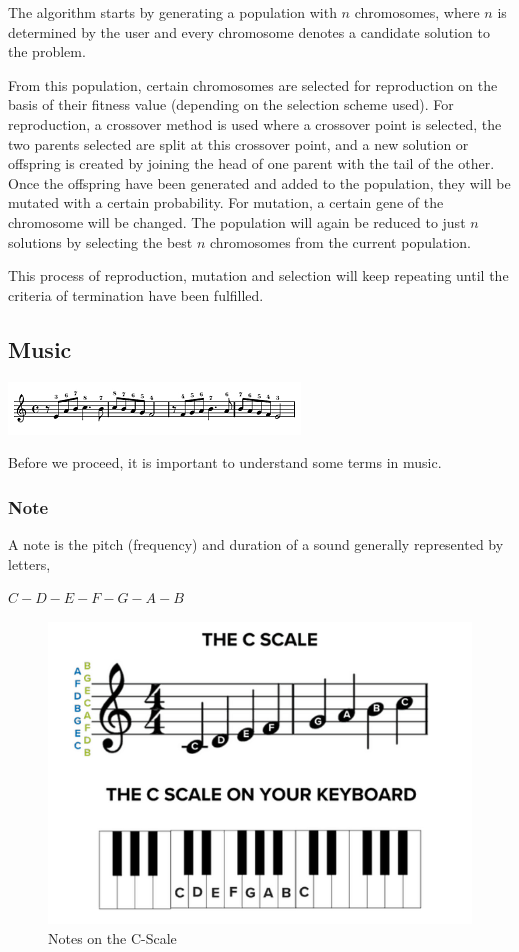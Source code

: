 \documentclass[conference]{IEEEtran}
\begin{document}
The algorithm starts by generating a population with $n$ chromosomes, where $n$ is determined by the user and every chromosome denotes a candidate solution to the problem.

From this population, certain chromosomes are selected for reproduction on the basis of their fitness value (depending on the selection scheme used). For reproduction, a crossover method is used where a crossover point is selected, the two parents selected are split at this crossover point, and a new solution or offspring is created by joining the head of one parent with the tail of the other. Once the offspring have been generated and added to the population, they will be mutated with a certain probability. For mutation, a certain gene of the chromosome will be changed. The population will again be reduced to just $n$ solutions by selecting the best $n$ chromosomes from the current population.

This process of reproduction, mutation and selection will keep repeating until the criteria of termination have been fulfilled.

\subsection{Music}
\includegraphics{music.png}

Before we proceed, it is important to understand some terms in music.

\subsubsection{Note}
A note is the pitch (frequency) and duration of a sound generally represented by letters,
\begin{center}
    $C-D-E-F-G-A-B$
\end{center}
\begin{figure}
\includegraphics[width=7 cm, height=7 cm]{notes.png}
\caption{Notes on the C-Scale \cite{b4}}
\end{figure}
\end{document}
